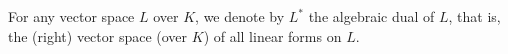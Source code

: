 For any vector space $L$ over $K$, we denote by $L^*$ the algebraic dual of $L$, that is, the (right) vector space (over $K$) of all linear forms on $L$.
